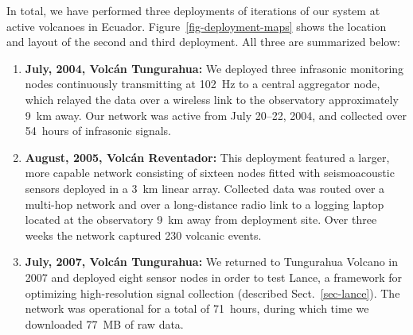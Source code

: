 In total, we have performed three deployments of iterations of our system at
active volcanoes in Ecuador. Figure~\ref{fig-deployment-maps} shows the
location and layout of the second and third deployment. All three are
summarized below:
\begin{enumerate}
\item \textbf{July, 2004, Volc\'{a}n Tungurahua:} We deployed three infrasonic
monitoring nodes continuously transmitting at 102~Hz to a central aggregator
node, which relayed the data over a wireless link to the observatory
approximately 9~km away.  Our network was active from July 20--22, 2004, and
collected over 54~hours of infrasonic signals.
\item \textbf{August, 2005, Volc\'{a}n Reventador:} This deployment featured a
larger, more capable network consisting of sixteen nodes fitted with
seismoacoustic sensors deployed in a 3~km linear array.  Collected data was
routed over a multi-hop network and over a long-distance radio link to a
logging laptop located at the observatory 9~km away from deployment site.
Over three weeks the network captured 230 volcanic events.
\item \textbf{July, 2007, Volc\'{a}n Tungurahua:} We returned to Tungurahua
Volcano in 2007 and deployed eight sensor nodes in order to test Lance, a
framework for optimizing high-resolution signal collection (described Sect.~\ref{sec-lance}). The network was operational for a total
of 71~hours, during which time we downloaded 77~MB of raw data.
\end{enumerate}

